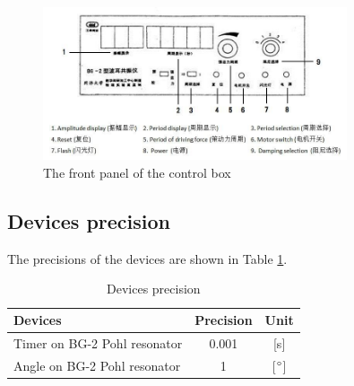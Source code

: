     \begin{figure}[H]
    \centering
        \includegraphics[width=0.8\textwidth]{images/3}
        \caption{The front panel of the control box}\label{panel}
    \end{figure}

\subsection{Devices precision}
    The precisions of the devices are shown in Table \ref{precision}.
    \begin{table}[H]
        \centering
        \begin{tabular}{|l|c|c|}
            \hline
            Devices & Precision & Unit\\ \hline
            Timer on BG-2 Pohl resonator & 0.001 & [s]\\ \hline
            Angle on BG-2 Pohl resonator & 1 & [$^\circ$]\\ \hline
        \end{tabular}
        \caption{Devices precision}\label{precision}
    \end{table}